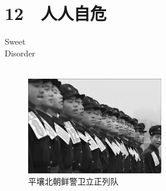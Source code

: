 \fancyhead[RO]{{\tiny{\textcolor{Gray}{\FA \ }}}\thepage}
\fancyhead[LE]{{\tiny{\textcolor{Gray}{\FA \ }}}\thepage}
\fancyfoot[LE,RO]{}
\fancyfoot[LO,CE]{}
\fancyfoot[CO,RE]{}
\chapter*{12 {\FA } 人人自危}
\vspace{15mm}
\begin{flushright}
	\textcolor{PinYinColor}{\EN \huge{Sweet\\
	Disorder\\
	\ \\}}
\end{flushright}

\begin{figure}[!htbp]
	\centering
	\includegraphics[width=6cm]{./Chapters/Images/12.jpg}
	\caption*{平壤北朝鲜警卫立正列队}
\end{figure}

